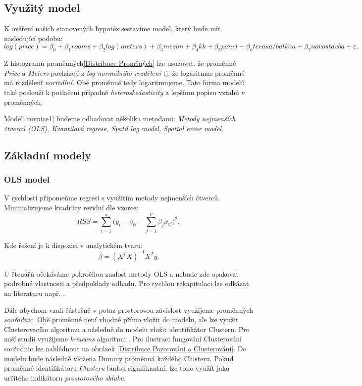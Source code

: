 \documentclass[11pt, a4paper]{article}
\begin{document}
\subsection{Využitý model}

K ověření našich stanovených hypotéz sestavíme model, který bude mít následující podobu:
  \begin{equation} \label{rovnice1}
log(price) = \beta_{0} +  \beta_{1}rooms  + \beta_{2}log(meters) + \beta_{3}mezon + \beta_{4}kk + \beta_{5}panel + \beta_{6}terasa/balkon + \beta_{7}novostavba + \varepsilon.
\end{equation}

Z histogramů proměnných\ref{Distribuce Proměných} lze usuzovat, že proměnné \textit{Price} a \textit{Meters} pocházejí z \textit{log-normálního rozdělení} tj, že logaritmus proměnné má rozdělení \textit{normální.} Obě proměnné tedy logaritmujeme. Tato forma modelů také poslouží k potlačení případně \textit{heteroskedasticity} a lepšímu popisu vztahů v proměnných.

Model \ref{rovnice1} budeme odhadovat několika metodami: \textit{Metody nejmenších čtverců (OLS), Kvantilová regrese, Spatil lag model, Spatial error model.}

\subsection{Základní modely}
\subsubsection{OLS model}

V rychlosti připomeňme regresi s využitím metody nejmenších čtverců. Minimalizujeme kvadráty reziduí dle vzorce:
  $$RSS = \sum_{i = 1}^{n} \Big(y_{i} - \beta_{0} - \sum_{j = 1}^{p}\beta_{j}x_{ij}\Big)^2, $$
  
  Kde řešení je k dispozici v analytickém tvaru:
  $$\hat\beta = (X^{T}X)^{-1}X^{T}y.$$
  
  U čtenářů očekáváme pokročilou znalost metody OLS a nebude zde opakovat podrobné vlastnosti a předpoklady odhadu. Pro rychlou rekapitulaci lze odkázat na literaturu např. \cite{wooldridge2016introductory-citovat_kapitolu}.

Dále abychom vzali částečně v potaz prostorovou závislost využijeme proměnných \textit{souřadnic}. Obě proměnné není vhodné přímo vložit do modelu, ale lze využit Clusterovacího algoritmu a následně do modelu vložit identifikátor Clusteru. Pro naší studii využijeme \textit{k-means} algoritmu \cite{james2013introduction}. Pro ilustraci fungování Clusterování souřadnic lze nahlédnout na obrázek \ref{Distribuce Pozorování a Clusterování}. Do modelu bude následně vložena Dummy proměnná každého Clusteru. Pokud proměnné identifikátoru \textit{Clusteru} budou signifikantní, lze toho využít jako určitého indikátoru \textit{prostorového shluku}.
\end{document}
